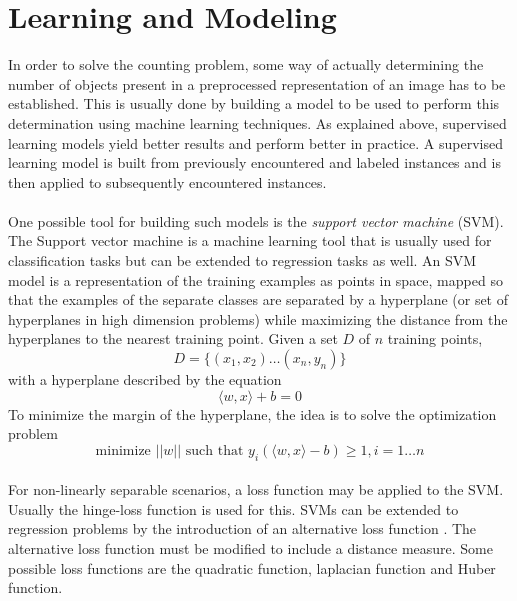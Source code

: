 \bigskip

\goodbreak

\section{Learning and Modeling}
In order to solve the counting problem, some way of actually determining the number of objects present in a preprocessed representation of an image has to be established. This is usually done by building a model to be used to perform this determination using machine learning techniques. As explained above, supervised learning models yield better results and perform better in practice. A supervised learning model is built from previously encountered and labeled instances and is then applied to subsequently encountered instances.\\ \\
%
One possible tool for building such models is the \textit{support vector machine} (SVM). The Support vector machine is a machine learning tool that is usually used for classification tasks but can be extended to regression tasks as well. An SVM model is a representation of the training examples as points in space, mapped so that the examples of the separate classes are separated by a hyperplane (or set of hyperplanes in high dimension problems) while maximizing the distance from the hyperplanes to the nearest training point. Given a set $D$ of $n$ training points, 
\begin{equation}
D = \{(x_1, x_2)  \ldots  (x_n, y_n)\}
\end{equation}
with a hyperplane described by the equation
\begin{equation}
\langle w,x \rangle + b = 0
\end{equation}
To minimize the margin of the hyperplane, the idea is to solve the optimization problem
\begin{equation}
\text{minimize }||w||\text{ such that }y_i(\langle w,x \rangle - b) \ge 1, i = 1  \ldots  n 
\end{equation}\\
%
For non-linearly separable scenarios, a loss function may be applied to the SVM. Usually the hinge-loss function is used for this. SVMs can be extended to regression problems by the introduction of an alternative loss function \cite{REF19}. The alternative loss function must be modified to include a distance measure. Some possible loss functions are the quadratic function, laplacian function and Huber function.\\ \\
